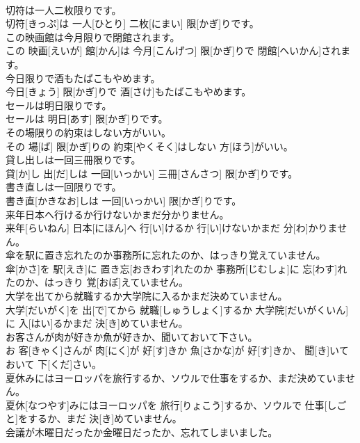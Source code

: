 \documentclass[8pt]{extreport}
\begin{document}
\begin{CJK}{UTF8}{min}
\\	切符は一人二枚限りです。	
\\	切符[きっぷ]は 一人[ひとり] 二枚[にまい] 限[かぎ]りです。	
\\	この映画館は今月限りで閉館されます。	
\\	この 映画[えいが] 館[かん]は 今月[こんげつ] 限[かぎ]りで 閉館[へいかん]されます。	
\\	今日限りで酒もたばこもやめます。	
\\	今日[きょう] 限[かぎ]りで 酒[さけ]もたばこもやめます。	
\\	セールは明日限りです。	
\\	セールは 明日[あす] 限[かぎ]りです。	
\\	その場限りの約束はしない方がいい。	
\\	その 場[ば] 限[かぎ]りの 約束[やくそく]はしない 方[ほう]がいい。	
\\	貸し出しは一回三冊限りです。	
\\	貸[か]し 出[だ]しは 一回[いっかい] 三冊[さんさつ] 限[かぎ]りです。	
\\	書き直しは一回限りです。	
\\	書き直[かきなお]しは 一回[いっかい] 限[かぎ]りです。	
\\	来年日本へ行けるか行けないかまだ分かりません。	
\\	来年[らいねん] 日本[にほん]へ 行[い]けるか 行[い]けないかまだ 分[わ]かりません。	
\\	傘を駅に置き忘れたのか事務所に忘れたのか、はっきり覚えていません。	
\\	傘[かさ]を 駅[えき]に 置き忘[おきわす]れたのか 事務所[じむしょ]に 忘[わす]れたのか、はっきり 覚[おぼ]えていません。	
\\	大学を出てから就職するか大学院に入るかまだ決めていません。	
\\	大学[だいがく]を 出[で]てから 就職[しゅうしょく]するか 大学院[だいがくいん]に 入[はい]るかまだ 決[き]めていません。	
\\	お客さんが肉が好きか魚が好きか、聞いておいて下さい。	
\\	お 客[きゃく]さんが 肉[にく]が 好[す]きか 魚[さかな]が 好[す]きか、 聞[き]いておいて 下[くだ]さい。	
\\	夏休みにはヨーロッパを旅行するか、ソウルで仕事をするか、まだ決めていません。	
\\	夏休[なつやす]みにはヨーロッパを 旅行[りょこう]するか、ソウルで 仕事[しごと]をするか、まだ 決[き]めていません。	
\\	会議が木曜日だったか金曜日だったか、忘れてしまいました。	

\end{CJK}
\end{document}
